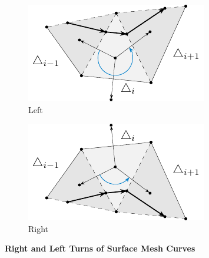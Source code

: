 \documentclass{stdlocal}
\begin{document}
  \begin{figure}
    \centering
    \begin{subfigure}[b]{0.45\linewidth}
      \centering
      \includegraphics[width=\linewidth]{figures/surface-mesh-curve-rot-left.pdf}
      \caption{Left}
    \end{subfigure}
    \hfill
    \begin{subfigure}[b]{0.45\linewidth}
      \centering
      \includegraphics[width=\linewidth]{figures/surface-mesh-curve-rot-right.pdf}
      \caption{Right}
    \end{subfigure}
    \caption[Right and Left Turns of Surface Mesh Curves]{
      \textbf{Right and Left Turns of Surface Mesh Curves}\\
    }
    \label{fig:surface-mesh-curve-turns}
  \end{figure}

\end{document}
